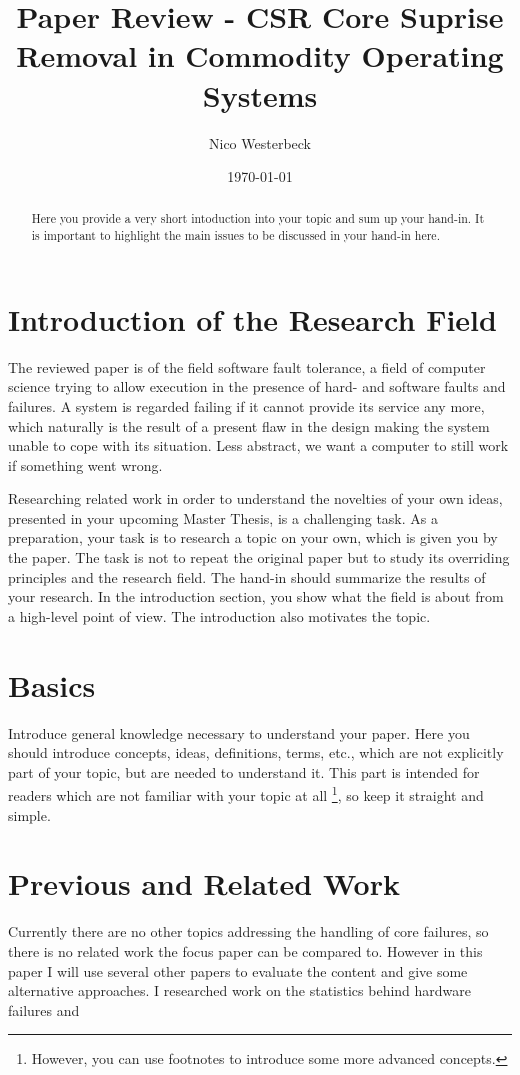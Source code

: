 \documentclass[a4paper,10pt,twoside]{article}
\title{Paper Review - CSR Core Suprise Removal in Commodity Operating Systems}
\author{Nico Westerbeck}
\date{\today}
\begin{document}
\maketitle

\begin{abstract}
Here you provide a very short intoduction into your topic and sum up your hand-in. 
It is important to highlight the main issues to be discussed in your hand-in here.
\end{abstract}

\tableofcontents

\section{Introduction of the Research Field}

The reviewed paper is of the field software fault tolerance, a field of computer science trying to allow execution in the presence of hard- and software faults and failures. A system is regarded failing if it cannot provide its service any more, which naturally is the result of a present flaw in the design making the system unable to cope with its situation. Less abstract, we want a computer to still work if something went wrong.

Researching related work in order to understand the novelties of your own ideas, presented in your upcoming Master Thesis, is a challenging task. 
As a preparation, your task is to research a topic on your own, which is given you by the paper.
The task is not to repeat the original paper but to study its overriding principles and the research field.
The hand-in should summarize the results of your research.
In the introduction section, you show what the field is about from a high-level point of view.
The introduction also motivates the topic.

\section{Basics}

Introduce general knowledge necessary to understand your paper.
Here you should introduce concepts, ideas, definitions, terms, etc., which are not explicitly part of your topic, but are needed to understand it. 
This part is intended for readers which are not familiar with your topic at all
\footnote{However, you can use footnotes to introduce some more advanced concepts.}, so keep it straight and simple.

\section{Previous and Related Work}
Currently there are no other topics addressing the handling of core failures, so there is no related work the focus paper can be compared to. However in this paper I will use several other papers to evaluate the content and give some alternative approaches. I researched work on the statistics behind hardware failures and 
\end{document}
